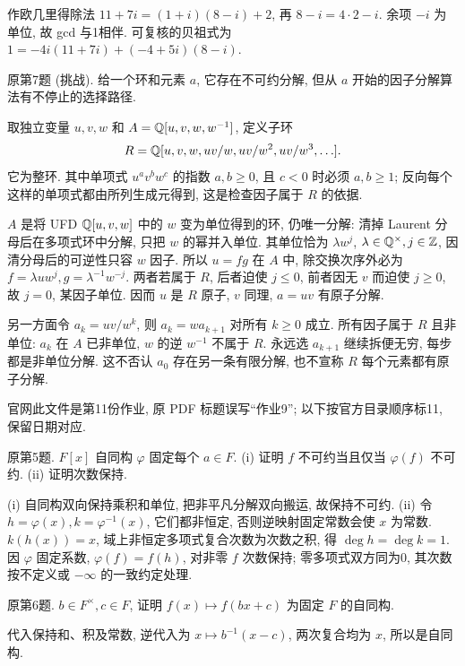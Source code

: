 \begin{solution}
作欧几里得除法 $11+7i=(1+i)(8-i)+2$, 再 $8-i=4\cdot2-i$. 余项 $-i$ 为单位, 故 gcd 与1相伴. 可复核的贝祖式为 $1=-4i(11+7i)+(-4+5i)(8-i)$.
\end{solution}
\begin{exercise}原第7题 (挑战). 给一个环和元素 $a$, 它存在不可约分解, 但从 $a$ 开始的因子分解算法有不停止的选择路径.\end{exercise}
\begin{solution}
取独立变量 $u,v,w$ 和 $A=\mathbb Q[u,v,w,w^{-1}]$, 定义子环
\[
R=\mathbb Q[u,v,w,uv/w,uv/w^2,uv/w^3,\ldots].
\]
它为整环. 其中单项式 $u^av^bw^c$ 的指数 $a,b\ge0$, 且 $c<0$ 时必须 $a,b\ge1$; 反向每个这样的单项式都由所列生成元得到, 这是检查因子属于 $R$ 的依据.

$A$ 是将 UFD $\mathbb Q[u,v,w]$ 中的 $w$ 变为单位得到的环, 仍唯一分解: 清掉 Laurent 分母后在多项式环中分解, 只把 $w$ 的幂并入单位. 其单位恰为 $\lambda w^j$, $\lambda\in\mathbb Q^\times,j\in\mathbb Z$, 因清分母后的可逆性只容 $w$ 因子. 所以 $u=fg$ 在 $A$ 中, 除交换次序外必为 $f=\lambda uw^j,g=\lambda^{-1}w^{-j}$. 两者若属于 $R$, 后者迫使 $j\le0$, 前者因无 $v$ 而迫使 $j\ge0$, 故 $j=0$, 某因子单位. 因而 $u$ 是 $R$ 原子, $v$ 同理, $a=uv$ 有原子分解.

另一方面令 $a_k=uv/w^k$, 则 $a_k=w a_{k+1}$ 对所有 $k\ge0$ 成立. 所有因子属于 $R$ 且非单位: $a_k$ 在 $A$ 已非单位, $w$ 的逆 $w^{-1}$ 不属于 $R$. 永远选 $a_{k+1}$ 继续拆便无穷, 每步都是非单位分解. 这不否认 $a_0$ 存在另一条有限分解, 也不宣称 $R$ 每个元素都有原子分解.
\end{solution}
官网此文件是第11份作业, 原 PDF 标题误写“作业9”; 以下按官方目录顺序标11, 保留日期对应.
\begin{exercise}原第5题. $F[x]$ 自同构 $\varphi$ 固定每个 $a\in F$. (i) 证明 $f$ 不可约当且仅当 $\varphi(f)$ 不可约. (ii) 证明次数保持.\end{exercise}
\begin{solution}
(i) 自同构双向保持乘积和单位, 把非平凡分解双向搬运, 故保持不可约. (ii) 令 $h=\varphi(x),k=\varphi^{-1}(x)$, 它们都非恒定, 否则逆映射固定常数会使 $x$ 为常数. $k(h(x))=x$, 域上非恒定多项式复合次数为次数之积, 得 $\deg h=\deg k=1$. 因 $\varphi$ 固定系数, $\varphi(f)=f(h)$, 对非零 $f$ 次数保持; 零多项式双方同为0, 其次数按不定义或 $-\infty$ 的一致约定处理.
\end{solution}
\begin{exercise}原第6题. $b\in F^\times,c\in F$, 证明 $f(x)\mapsto f(bx+c)$ 为固定 $F$ 的自同构.\end{exercise}
\begin{solution}
代入保持和、积及常数, 逆代入为 $x\mapsto b^{-1}(x-c)$, 两次复合均为 $x$, 所以是自同构.
\end{solution}
